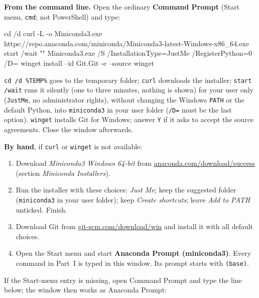 \documentclass[11pt,a4paper]{article}
\newcommand{\code}[1]{\lstinline{#1}}
\begin{document}
\textbf{From the command line.} Open the ordinary \textbf{Command Prompt} (Start menu,
\code{cmd}; not PowerShell) and type:

\begin{cmdsmall}
cd /d %
curl -L -o Miniconda3.exe https://repo.anaconda.com/miniconda/Miniconda3-latest-Windows-x86_64.exe
start /wait "" Miniconda3.exe /S /InstallationType=JustMe /RegisterPython=0 /D=%
winget install --id Git.Git -e --source winget
\end{cmdsmall}

\texttt{cd /d \%TEMP\%} goes to the temporary folder; \code{curl} downloads the installer;
\code{start /wait} runs it silently (one to three minutes,
nothing is shown) for your user only (\code{JustMe}, no administrator rights), without
changing the Windows \code{PATH} or the default Python, into \texttt{miniconda3} in your user
folder (\code{/D=} must be the last option). \code{winget} installs Git for Windows; answer
\code{Y} if it asks to accept the source agreements. Close the window afterwards.

\textbf{By hand}, if \code{curl} or \code{winget} is not available:

\begin{enumerate}
  \item Download \emph{Miniconda3 Windows 64-bit} from
        \href{https://www.anaconda.com/download/success}{anaconda.com/download/success}
        (section \emph{Miniconda Installers}).
  \item Run the installer with these choices:
        \emph{Just Me}; keep the suggested folder
        (\texttt{miniconda3} in your user folder); keep \emph{Create shortcuts};
        leave \emph{Add to PATH} unticked. Finish.
  \item Download Git from \href{https://git-scm.com/download/win}{git-scm.com/download/win} and
        install it with all default choices.
  \item Open the Start menu and start \textbf{Anaconda Prompt (miniconda3)}.
        Every command in Part~I is typed in this window. Its prompt starts with \code{(base)}.
\end{enumerate}

If the Start-menu entry is missing, open Command Prompt and type the line below; the window
then works as Anaconda Prompt:

\begin{cmd}
\end{cmd}
\end{document}
